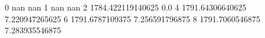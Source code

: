 0 nan nan
1 nan nan
2 1784.422119140625 0.0
4 1791.64306640625 7.220947265625
6 1791.6787109375 7.256591796875
8 1791.7060546875 7.283935546875
